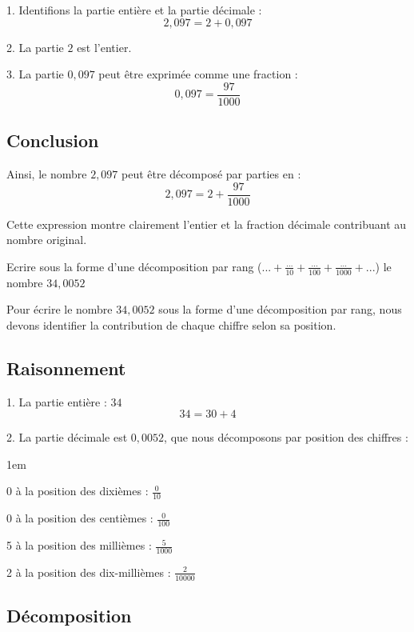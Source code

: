 \documentclass[answers]{exam}
\begin{document}
\begin{questions}
\begin{solution}
1. Identifions la partie entière et la partie décimale :
   \[
   2,097 = 2 + 0,097
   \]

2. La partie \(2\) est l'entier.

3. La partie \(0,097\) peut être exprimée comme une fraction :
   \[
   0,097 = \frac{97}{1000}
   \]

\subsection*{Conclusion}

Ainsi, le nombre \(2,097\) peut être décomposé par parties en :
\[
2,097 = 2 + \frac{97}{1000}
\]

Cette expression montre clairement l'entier et la fraction décimale contribuant au nombre original.
\end{solution}

\question[0.5] Ecrire sous la forme d'une décomposition par rang ($... + \frac{...}{10} + \frac{...}{100} + \frac{...}{1000} + ...$) le nombre $34,0052$
  

\begin{solution}
Pour écrire le nombre \(34,0052\) sous la forme d'une décomposition par rang, nous devons identifier la contribution de chaque chiffre selon sa position.

\subsection*{Raisonnement}

1. La partie entière : \(34\)
    \[
    34 = 30 + 4 
    \]

2. La partie décimale est \(0,0052\), que nous décomposons par position des chiffres :
    \begin{addmargin}[4em]{1em}
    \begin{compactitem}
        \item 0 à la position des dixièmes : \(\frac{0}{10}\)
        \item 0 à la position des centièmes : \(\frac{0}{100}\)
        \item 5 à la position des millièmes : \(\frac{5}{1000}\)
        \item 2 à la position des dix-millièmes : \(\frac{2}{10000}\)
    \end{compactitem}
    \end{addmargin}

\subsection*{Décomposition}


\end{solution}
\end{questions}
\end{document}
